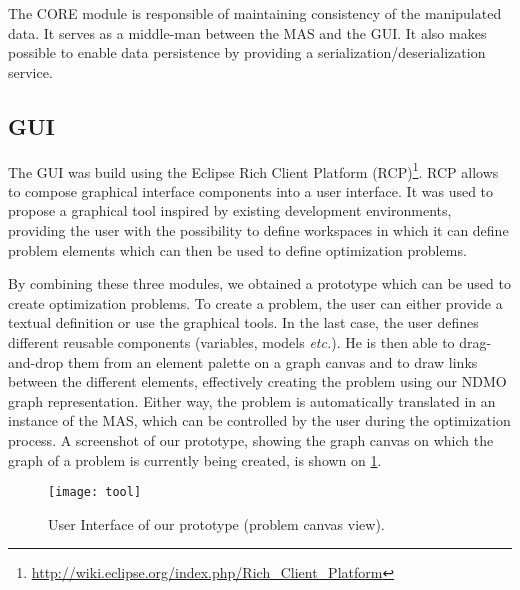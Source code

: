 The CORE module is responsible of maintaining consistency of the manipulated data. It serves as a middle-man between the MAS and the GUI. It also makes possible to enable data persistence by providing a serialization/deserialization service.

\subsection{GUI}

The GUI was build using the Eclipse Rich Client Platform (RCP)\footnote{\url{http://wiki.eclipse.org/index.php/Rich_Client_Platform}}. RCP allows to compose graphical interface components into a user interface. It was used to propose a graphical tool inspired by existing development environments, providing the user with the possibility to define workspaces in which it can define problem elements which can then be used to define optimization problems.

\bigskip

By combining these three modules, we obtained a prototype which can be used to create optimization problems. To create a problem, the user can either provide a textual definition or use the graphical tools. In the last case, the user defines different reusable components (variables, models \emph{etc.}). He is then able to drag-and-drop them from an element palette on a graph canvas and to draw links between the different elements, effectively creating the problem using our NDMO graph representation. Either way, the problem is automatically translated in an instance of the MAS, which can be controlled by the user during the optimization process. A screenshot of our prototype, showing the graph canvas on which the graph of a problem is currently being created, is shown on \figurename{} \ref{tool}.

\begin{figure}
\texttt{[image: tool]}
\caption{User Interface of our prototype (problem canvas view).}\label{tool}
\end{figure}